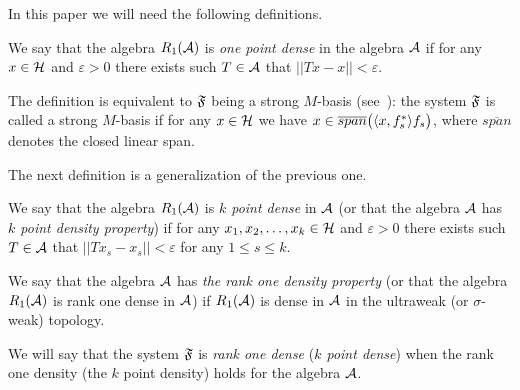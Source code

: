 \documentclass[12pt,oneside,a4paper]{amsart}
\begin{document}
  In this paper we will need the following definitions.
  \begin{definition}
    \label{1pd}
    We say that the algebra $R_1(\cal{A})$ is \emph{one point dense} in the algebra $\cal{A}$ if for any $x \in \cal{H}$ and $\varepsilon > 0$
      there exists such $T\in \cal{A}$ that $||Tx - x|| < \varepsilon$.
  \end{definition}

    The definition is equivalent to $\fsys$ being a strong $M$-basis (see~\cite{katavolos}):
    the system $\fsys$ is called a strong $M$-basis if for any $x\in\cal{H}$ we have $x \in \overline{span}\big(\inner{x}{f^*_s}f_s\big)$, where
      $\overline{span}$ denotes the closed linear span.

  The next definition is a generalization of the previous one.
  \begin{definition}
    \label{kpd}
    We say that the algebra $R_1(\cal{A})$ is \emph{$k$ point dense} in $\cal{A}$ (or that the algebra $\cal{A}$ has
      \emph{$k$ point density property}) if for any $x_1, x_2, \dots, x_k \in \cal{H}$ and $\varepsilon > 0$
      there exists such $T\in \cal{A}$ that $||Tx_s - x_s|| < \varepsilon$ for any $1 \leq s \leq k$.
  \end{definition}

  \begin{definition}
    \label{r1d}
    We say that the algebra $\cal{A}$ has \emph{the rank one density property} (or that the algebra $R_1(\cal{A})$
      is rank one dense in $\cal{A}$) if
      $R_1(\cal{A})$ is dense in $\cal{A}$ in the ultraweak (or $\sigma$-weak) topology.
  \end{definition}
  We will say that the system $\fsys$ is \emph{rank one dense} (\emph{$k$ point dense})
    when the rank one density (the $k$ point density) holds for the algebra $\cal{A}$.

\end{document}
